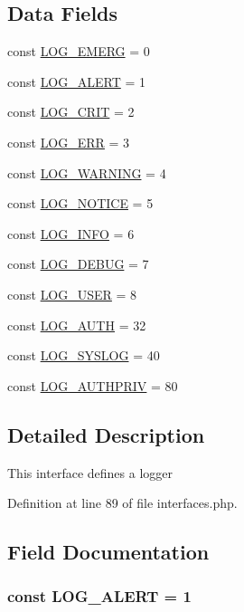 \subsection*{Data Fields}
\begin{DoxyCompactItemize}
\item 
const \hyperlink{interfaceIXLLogger_a1942ba0d2dc43d54ed6539a4785bfd3e}{LOG\_\-EMERG} = 0
\item 
const \hyperlink{interfaceIXLLogger_a0f4fff32039f86bc6c4af5a34096dcad}{LOG\_\-ALERT} = 1
\item 
const \hyperlink{interfaceIXLLogger_a1165ceb2bedc1e9dd20e9733157a7643}{LOG\_\-CRIT} = 2
\item 
const \hyperlink{interfaceIXLLogger_ade69ae21446f91f019dd33eea3c385c8}{LOG\_\-ERR} = 3
\item 
const \hyperlink{interfaceIXLLogger_acc722b40b62aea8dc0261e3fcc79eef4}{LOG\_\-WARNING} = 4
\item 
const \hyperlink{interfaceIXLLogger_a6271a91ccd22714d6ef2a50b3e96f976}{LOG\_\-NOTICE} = 5
\item 
const \hyperlink{interfaceIXLLogger_a951775da27343035f4aa2c323df714f4}{LOG\_\-INFO} = 6
\item 
const \hyperlink{interfaceIXLLogger_a9f869ea06c29e0e5114b7e8ccfe4e30a}{LOG\_\-DEBUG} = 7
\item 
const \hyperlink{interfaceIXLLogger_a09a5a876047162a2967ad2a82b6887d3}{LOG\_\-USER} = 8
\item 
const \hyperlink{interfaceIXLLogger_a97ca345ed0839cfb6eb341e9f9a0e72f}{LOG\_\-AUTH} = 32
\item 
const \hyperlink{interfaceIXLLogger_aa7e0b1e59428b3a89b8b03d501805ae9}{LOG\_\-SYSLOG} = 40
\item 
const \hyperlink{interfaceIXLLogger_a92b47d92abc4c45804664e94666fd918}{LOG\_\-AUTHPRIV} = 80
\end{DoxyCompactItemize}


\subsection{Detailed Description}
This interface defines a logger 

Definition at line 89 of file interfaces.php.



\subsection{Field Documentation}
\hypertarget{interfaceIXLLogger_a0f4fff32039f86bc6c4af5a34096dcad}{
\subsubsection[{LOG\_\-ALERT}]{\setlength{\rightskip}{0pt plus 5cm}const {\bf LOG\_\-ALERT} = 1}}
\label{interfaceIXLLogger_a0f4fff32039f86bc6c4af5a34096dcad}


